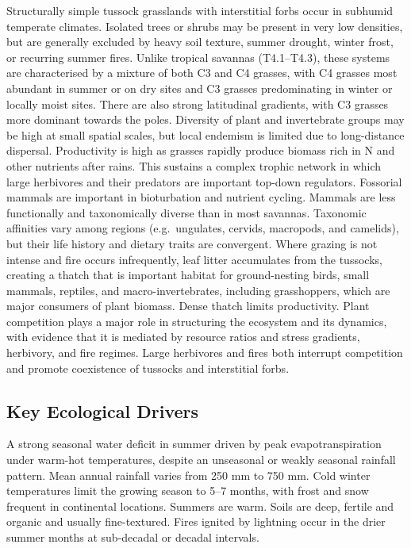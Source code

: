 \documentclass[
  letterpaper,
  DIV=11,
  numbers=noendperiod]{scrartcl}
\begin{document}
Structurally simple tussock grasslands with interstitial forbs occur in
subhumid temperate climates. Isolated trees or shrubs may be present in
very low densities, but are generally excluded by heavy soil texture,
summer drought, winter frost, or recurring summer fires. Unlike tropical
savannas (T4.1--T4.3), these systems are characterised by a mixture of
both C3 and C4 grasses, with C4 grasses most abundant in summer or on
dry sites and C3 grasses predominating in winter or locally moist sites.
There are also strong latitudinal gradients, with C3 grasses more
dominant towards the poles. Diversity of plant and invertebrate groups
may be high at small spatial scales, but local endemism is limited due
to long-distance dispersal. Productivity is high as grasses rapidly
produce biomass rich in N and other nutrients after rains. This sustains
a complex trophic network in which large herbivores and their predators
are important top-down regulators. Fossorial mammals are important in
bioturbation and nutrient cycling. Mammals are less functionally and
taxonomically diverse than in most savannas. Taxonomic affinities vary
among regions (e.g.~ungulates, cervids, macropods, and camelids), but
their life history and dietary traits are convergent. Where grazing is
not intense and fire occurs infrequently, leaf litter accumulates from
the tussocks, creating a thatch that is important habitat for
ground-nesting birds, small mammals, reptiles, and macro-invertebrates,
including grasshoppers, which are major consumers of plant biomass.
Dense thatch limits productivity. Plant competition plays a major role
in structuring the ecosystem and its dynamics, with evidence that it is
mediated by resource ratios and stress gradients, herbivory, and fire
regimes. Large herbivores and fires both interrupt competition and
promote coexistence of tussocks and interstitial forbs.

\subsection{Key Ecological Drivers}\label{key-ecological-drivers-87}

A strong seasonal water deficit in summer driven by peak
evapotranspiration under warm-hot temperatures, despite an unseasonal or
weakly seasonal rainfall pattern. Mean annual rainfall varies from 250
mm to 750 mm. Cold winter temperatures limit the growing season to 5--7
months, with frost and snow frequent in continental locations. Summers
are warm. Soils are deep, fertile and organic and usually fine-textured.
Fires ignited by lightning occur in the drier summer months at
sub-decadal or decadal intervals.
\end{document}
